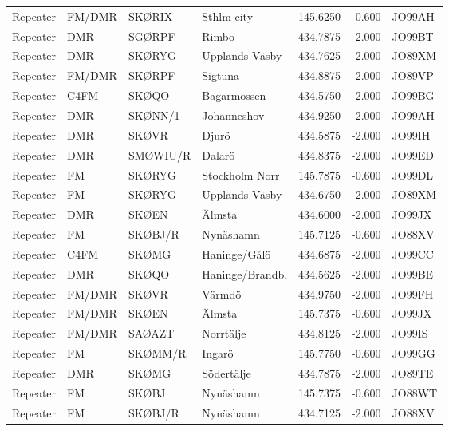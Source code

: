 \begin{longtable}{llllrrl}
	Repeater & FM/DMR     & SKØRIX   & Sthlm city      &   145.6250 &   -0.600 & JO99AH \\
	Repeater & DMR        & SGØRPF   & Rimbo           &   434.7875 &   -2.000 & JO99BT \\
	Repeater & DMR        & SKØRYG   & Upplands Väsby  &   434.7625 &   -2.000 & JO89XM \\
	Repeater & FM/DMR     & SKØRPF   & Sigtuna         &   434.8875 &   -2.000 & JO89VP \\
	Repeater & C4FM       & SKØQO    & Bagarmossen     &   434.5750 &   -2.000 & JO99BG \\
	Repeater & DMR        & SKØNN/1  & Johanneshov     &   434.9250 &   -2.000 & JO99AH \\
	Repeater & DMR        & SKØVR    & Djurö           &   434.5875 &   -2.000 & JO99IH \\
	Repeater & DMR        & SMØWIU/R & Dalarö          &   434.8375 &   -2.000 & JO99ED \\
	Repeater & FM         & SKØRYG   & Stockholm Norr  &   145.7875 &   -0.600 & JO99DL \\
	Repeater & FM         & SKØRYG   & Upplands Väsby  &   434.6750 &   -2.000 & JO89XM \\
	Repeater & DMR        & SKØEN    & Älmsta          &   434.6000 &   -2.000 & JO99JX \\
	Repeater & FM         & SKØBJ/R  & Nynäshamn       &   145.7125 &   -0.600 & JO88XV \\
	Repeater & C4FM       & SKØMG    & Haninge/Gålö    &   434.6875 &   -2.000 & JO99CC \\
	Repeater & DMR        & SKØQO    & Haninge/Brandb. &   434.5625 &   -2.000 & JO99BE \\
	Repeater & FM/DMR     & SKØVR    & Värmdö          &   434.9750 &   -2.000 & JO99FH \\
	Repeater & FM/DMR     & SKØEN    & Älmsta          &   145.7375 &   -0.600 & JO99JX \\
	Repeater & FM/DMR     & SAØAZT   & Norrtälje       &   434.8125 &   -2.000 & JO99IS \\
	Repeater & FM         & SKØMM/R  & Ingarö          &   145.7750 &   -0.600 & JO99GG \\
	Repeater & DMR        & SKØMG    & Södertälje      &   434.7875 &   -2.000 & JO89TE \\
	Repeater & FM         & SKØBJ    & Nynäshamn       &   145.7375 &   -0.600 & JO88WT \\
	Repeater & FM         & SKØBJ/R  & Nynäshamn       &   434.7125 &   -2.000 & JO88XV \\

\end{longtable}
